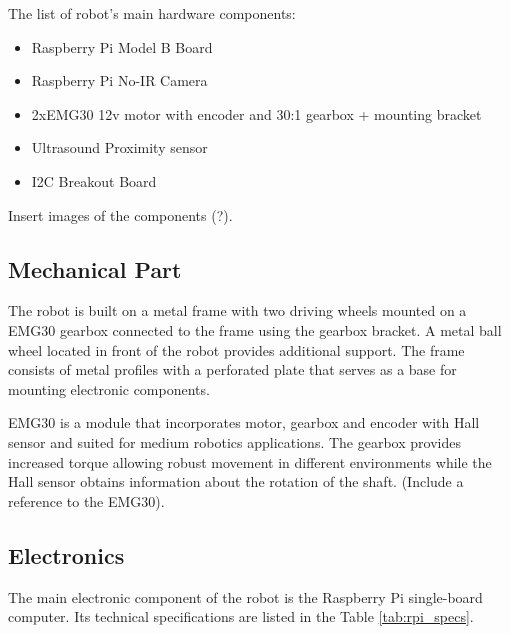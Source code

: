 The list of robot's main hardware components:

\begin{itemize}
  \item Raspberry Pi Model B Board
  \item Raspberry Pi No-IR Camera
  \item 2xEMG30 12v motor with encoder and 30:1 gearbox + mounting bracket
  \item Ultrasound Proximity sensor
  \item I2C Breakout Board
\end{itemize}

Insert images of the components (?).

\subsection*{Mechanical Part}

The robot is built on a metal frame with two driving wheels mounted on a EMG30
gearbox connected to the frame using the gearbox bracket. A metal ball wheel
located in front of the robot provides additional support. The frame consists of
metal profiles with a perforated plate that serves as a base for mounting
electronic components.

EMG30 is a module that incorporates motor, gearbox and encoder with Hall sensor
and suited for medium robotics applications. The gearbox provides increased
torque allowing robust movement in different environments while the Hall sensor
obtains information about the rotation of the shaft. (Include a reference to
the EMG30).



 

\subsection*{Electronics}

The main electronic component of the robot is the Raspberry Pi single-board
computer. Its technical specifications are listed in the Table
\ref{tab:rpi_specs}.


